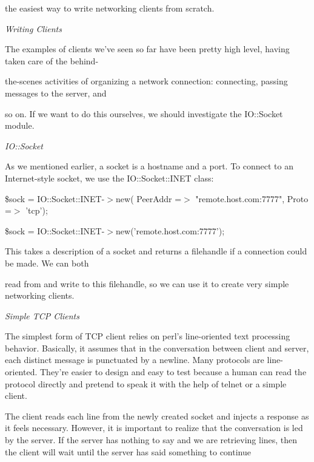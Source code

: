 \documentclass[a4paper,11pt]{book}
\begin{document}
\noindent the easiest way to write networking clients from scratch.

\noindent 

\noindent \textit{Writing Clients}

\noindent The examples of clients we've seen so far have been pretty high level, having taken care of the behind-

\noindent the-scenes activities of organizing a network connection: connecting, passing messages to the server, and

\noindent so on. If we want to do this ourselves, we should investigate the IO::Socket module.

\noindent 

\noindent \textit{IO::Socket}

\noindent As we mentioned earlier, a socket is a hostname and a port. To connect to an Internet-style socket, we use the IO::Socket::INET class:

\noindent 

\noindent \$sock = IO::Socket::INET-$>$new( PeerAddr =$>$ "remote.host.com:7777", Proto =$>$ 'tcp');

\noindent \$sock = IO::Socket::INET-$>$new('remote.host.com:7777');

\noindent 

\noindent 

\noindent This takes a description of a socket and returns a filehandle if a connection could be made. We can both

\noindent read from and write to this filehandle, so we can use it to create very simple networking clients.

\noindent 

\noindent \textit{Simple TCP Clients}

\noindent The simplest form of TCP client relies on perl's line-oriented text processing behavior. Basically, it assumes that in the conversation between client and server, each distinct message is punctuated by a newline. Many protocols are line-oriented. They're easier to design and easy to test because a human can read the protocol directly and pretend to speak it with the help of telnet or a simple client.

\noindent 

\noindent The client reads each line from the newly created socket and injects a response as it feels necessary. However, it is important to realize that the conversation is led by the server. If the server has nothing to say and we are retrieving lines, then the client will wait until the server has said something to continue
\end{document}

